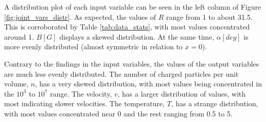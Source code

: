 A distribution plot of each input variable can be seen in the left column of Figure \ref{fig:joint_vars_distr}. As expected, the values of $R$ range from 1 to about 31.5. This is corroborated by Table \ref{tab:data_stats}, with most values concentrated around 1. $B [G]$ displays a skewed distribution. At the same time, $\alpha [deg]$ is more evenly distributed (almost symmetric in relation to $x=0$).

Contrary to the findings in the input variables, the values of the output variables are much less evenly distributed. The number of charged particles per unit volume, $n$, has a very skewed distribution, with most values being concentrated in the $10^{3}$ to $10^{7}$ range. The velocity, $v$, has a larger distribution of values, with most indicating slower velocities. The temperature, $T$, has a strange distribution, with most values concentrated near 0 and the rest ranging from 0.5 to 5.
